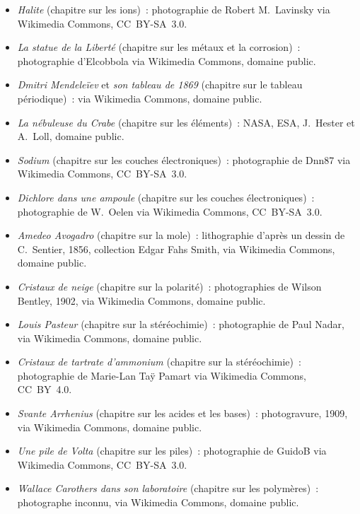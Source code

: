 \begin{itemize}
        l'atome)~: photographie, George Grantham Bain Collection, Library
        of Congress, via Wikimedia Commons, domaine public.
  \item \emph{Halite} (chapitre sur les ions)~: photographie de Robert
        M.~Lavinsky via Wikimedia Commons, CC~BY-SA~3.0.
  \item \emph{La statue de la Liberté} (chapitre sur les métaux et la
        corrosion)~: photographie d'Elcobbola via Wikimedia Commons,
        domaine public.
  \item \emph{Dmitri Mendeleïev} et \emph{son tableau de 1869} (chapitre
        sur le tableau périodique)~: via Wikimedia Commons, domaine
        public.
  \item \emph{La nébuleuse du Crabe} (chapitre sur les éléments)~: NASA,
        ESA, J.~Hester et A.~Loll, domaine public.
  \item \emph{Sodium} (chapitre sur les couches électroniques)~:
        photographie de Dnn87 via Wikimedia Commons, CC~BY-SA~3.0.
  \item \emph{Dichlore dans une ampoule} (chapitre sur les couches
        électroniques)~: photographie de W.~Oelen via Wikimedia Commons,
        CC~BY-SA~3.0.
  \item \emph{Amedeo Avogadro} (chapitre sur la mole)~: lithographie
        d'après un dessin de C.~Sentier, 1856, collection Edgar Fahs
        Smith, via Wikimedia Commons, domaine public.
  \item \emph{Cristaux de neige} (chapitre sur la polarité)~:
        photographies de Wilson Bentley, 1902, via Wikimedia Commons,
        domaine public.
  \item \emph{Louis Pasteur} (chapitre sur la stéréochimie)~:
        photographie de Paul Nadar, via Wikimedia Commons, domaine
        public.
  \item \emph{Cristaux de tartrate d'ammonium} (chapitre sur la
        stéréochimie)~: photographie de Marie-Lan Taÿ Pamart via
        Wikimedia Commons, CC~BY~4.0.
  \item \emph{Svante Arrhenius} (chapitre sur les acides et les
        bases)~: photogravure, 1909, via Wikimedia Commons, domaine
        public.
  \item \emph{Une pile de Volta} (chapitre sur les piles)~: photographie
        de GuidoB via Wikimedia Commons, CC~BY-SA~3.0.
  \item \emph{Wallace Carothers dans son laboratoire} (chapitre sur les
        polymères)~: photographe inconnu, via Wikimedia Commons, domaine
        public.
\end{itemize}

